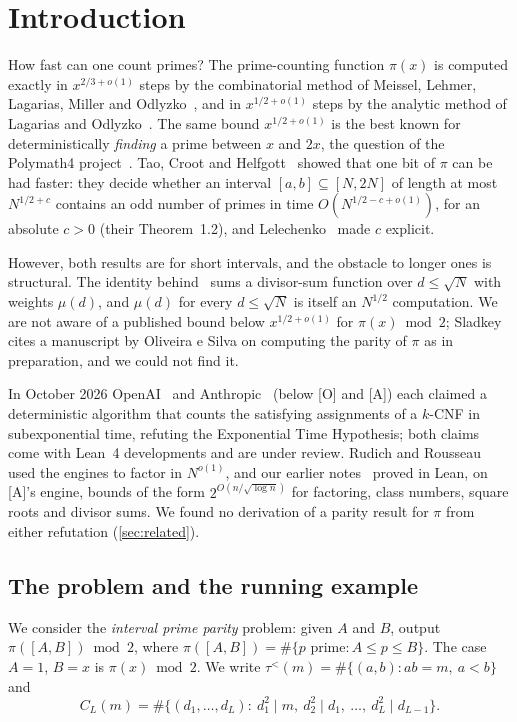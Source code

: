 \documentclass[10pt]{amsart}
\theoremstyle{plain}
\theoremstyle{definition}
\theoremstyle{remark}
\numberwithin{equation}{section}
\newcommand{\A}{\textup{[A]}}
\newcommand{\Oa}{\textup{[O]}}
\newcommand{\tl}{\tau^{<}}
\newcommand{\rate}{2^{O(n/\sqrt{\log n})}}
\begin{document}
\section{Introduction}\label{sec:intro}

How fast can one count primes? The prime-counting function $\pi(x)$ is computed exactly in
$x^{2/3+o(1)}$ steps by the combinatorial method of Meissel, Lehmer, Lagarias, Miller and
Odlyzko~\cite{LMO85,DR96}, and in $x^{1/2+o(1)}$ steps by the analytic method of Lagarias and
Odlyzko~\cite{LO87}. The same bound $x^{1/2+o(1)}$ is the best known for deterministically
\emph{finding} a prime between $x$ and $2x$, the question of the Polymath4 project~\cite{Tao09,TCH12}.
Tao, Croot and Helfgott~\cite{TCH12} showed that one bit of $\pi$ can be had faster: they decide
whether an interval $[a,b]\subseteq[N,2N]$ of length at most $N^{1/2+c}$ contains an odd number of
primes in time $O(N^{1/2-c+o(1)})$, for an absolute $c>0$ (their Theorem~1.2), and
Lelechenko~\cite{Lel13} made $c$ explicit.

However, both results are for short intervals, and the obstacle to longer ones is structural. The
identity behind~\cite{TCH12} sums a divisor-sum function over $d\le\sqrt N$ with weights $\mu(d)$, and
$\mu(d)$ for every $d\le\sqrt N$ is itself an $N^{1/2}$ computation. We are not aware of a published bound
below $x^{1/2+o(1)}$ for $\pi(x)\bmod 2$; Sladkey~\cite[ref.~5]{Sla12} cites a manuscript by Oliveira e
Silva on computing the parity of $\pi$ as in preparation, and we could not find it.

In October 2026 OpenAI~\cite{OpenAI26} and Anthropic~\cite{Anthropic26} (below \Oa{} and \A) each
claimed a deterministic algorithm that counts the satisfying assignments of a $k$-CNF in subexponential
time, refuting the Exponential Time Hypothesis; both claims come with Lean~4 developments and are under
review. Rudich and Rousseau~\cite{RR26} used the engines to factor in $N^{o(1)}$, and our earlier
notes~\cite{TulFac26,TulCN26} proved in Lean, on \A's engine, bounds of the form $\rate$ for factoring,
class numbers, square roots and divisor sums. We found no derivation of a parity result for $\pi$ from
either refutation (\cref{sec:related}).

\subsection{The problem and the running example}
We consider the \emph{interval prime parity} problem: given $A$ and $B$, output
$\pi([A,B])\bmod 2$, where $\pi([A,B])=\#\{p\text{ prime}:A\le p\le B\}$. The case $A=1$, $B=x$ is
$\pi(x)\bmod2$. We write $\tl(m)=\#\{(a,b):ab=m,\ a<b\}$ and
\[
  C_L(m)=\#\{(d_1,\dots,d_L):\ d_1^2\mid m,\ d_2^2\mid d_1,\ \dots,\ d_L^2\mid d_{L-1}\}.
\]
\end{document}
